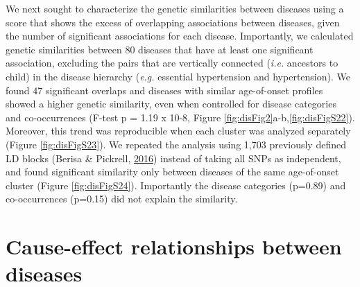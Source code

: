 \documentclass[12pt,twoside]{unicam}
\begin{document}
We next sought to characterize the genetic similarities between diseases using a score that shows the excess of overlapping associations between diseases, given the number of significant associations for each disease. Importantly, we calculated genetic similarities between 80 diseases that have at least one significant association, excluding the pairs that are vertically connected (\emph{i.e.} ancestors to child) in the disease hierarchy (\emph{e.g.} essential hypertension and hypertension). We found 47 significant overlaps and diseases with similar age-of-onset profiles showed a higher genetic similarity, even when controlled for disease categories and co-occurrences (F-test p = 1.19 x 10-8, Figure \ref{fig:disFig2}a-b,\ref{fig:disFigS22}). Moreover, this trend was reproducible when each cluster was analyzed separately (Figure \ref{fig:disFigS23}). We repeated the analysis using 1,703 previously defined LD blocks (Berisa \& Pickrell, \protect\hyperlink{ref-Berisa2016}{2016}) instead of taking all SNPs as independent, and found significant similarity only between diseases of the same age-of-onset cluster (Figure \ref{fig:disFigS24}). Importantly the disease categories (p=0.89) and co-occurrences (p=0.15) did not explain the similarity.

\hypertarget{cause-effect-relationships-between-diseases}{%
\section{Cause-effect relationships between diseases}\label{cause-effect-relationships-between-diseases}}
\end{document}
